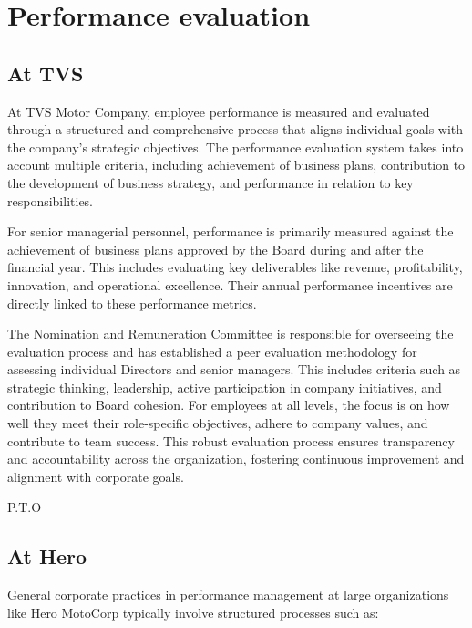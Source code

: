 \section{Performance evaluation}

\subsection{At TVS}

At TVS Motor Company, employee performance is measured and evaluated through a structured and comprehensive process that aligns individual goals with the company’s strategic objectives. The performance evaluation system takes into account multiple criteria, including achievement of business plans, contribution to the development of business strategy, and performance in relation to key responsibilities.

For senior managerial personnel, performance is primarily measured against the achievement of business plans approved by the Board during and after the financial year. This includes evaluating key deliverables like revenue, profitability, innovation, and operational excellence. Their annual performance incentives are directly linked to these performance metrics.

The Nomination and Remuneration Committee is responsible for overseeing the evaluation process and has established a peer evaluation methodology for assessing individual Directors and senior managers. This includes criteria such as strategic thinking, leadership, active participation in company initiatives, and contribution to Board cohesion. For employees at all levels, the focus is on how well they meet their role-specific objectives, adhere to company values, and contribute to team success. This robust evaluation process ensures transparency and accountability across the organization, fostering continuous improvement and alignment with corporate goals\cite{TVS_ANNUAL_REPORT}.

\begin{flushright}
	P.T.O
\end{flushright}

\newpage

\subsection{At Hero}

General corporate practices in performance management at large organizations like Hero MotoCorp\cite{hero-employee} typically involve structured processes such as:

